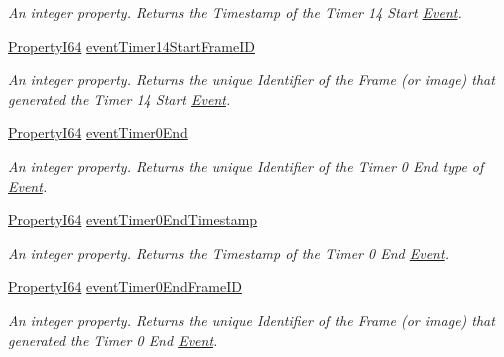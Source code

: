 \begin{DoxyCompactItemize}
\begin{DoxyCompactList}\small\item\em An integer property. Returns the Timestamp of the Timer 14 Start \hyperlink{classmv_i_m_p_a_c_t_1_1acquire_1_1_event}{Event}. \end{DoxyCompactList}\item 
\hyperlink{group___common_interface_ga81749b2696755513663492664a18a893}{Property\+I64} \hyperlink{classmv_i_m_p_a_c_t_1_1acquire_1_1_gen_i_cam_1_1_event_control_ac326d3d31139e94d4b2260f84fb7757a}{event\+Timer14\+Start\+Frame\+I\+D}
\begin{DoxyCompactList}\small\item\em An integer property. Returns the unique Identifier of the Frame (or image) that generated the Timer 14 Start \hyperlink{classmv_i_m_p_a_c_t_1_1acquire_1_1_event}{Event}. \end{DoxyCompactList}\item 
\hyperlink{group___common_interface_ga81749b2696755513663492664a18a893}{Property\+I64} \hyperlink{classmv_i_m_p_a_c_t_1_1acquire_1_1_gen_i_cam_1_1_event_control_aa40c08e47812676fa8773d0da9403446}{event\+Timer0\+End}
\begin{DoxyCompactList}\small\item\em An integer property. Returns the unique Identifier of the Timer 0 End type of \hyperlink{classmv_i_m_p_a_c_t_1_1acquire_1_1_event}{Event}. \end{DoxyCompactList}\item 
\hyperlink{group___common_interface_ga81749b2696755513663492664a18a893}{Property\+I64} \hyperlink{classmv_i_m_p_a_c_t_1_1acquire_1_1_gen_i_cam_1_1_event_control_a6411179f8c9814d88d754f88576814d6}{event\+Timer0\+End\+Timestamp}
\begin{DoxyCompactList}\small\item\em An integer property. Returns the Timestamp of the Timer 0 End \hyperlink{classmv_i_m_p_a_c_t_1_1acquire_1_1_event}{Event}. \end{DoxyCompactList}\item 
\hyperlink{group___common_interface_ga81749b2696755513663492664a18a893}{Property\+I64} \hyperlink{classmv_i_m_p_a_c_t_1_1acquire_1_1_gen_i_cam_1_1_event_control_a2b22c14c5670f55bc710e17c63554684}{event\+Timer0\+End\+Frame\+I\+D}
\begin{DoxyCompactList}\small\item\em An integer property. Returns the unique Identifier of the Frame (or image) that generated the Timer 0 End \hyperlink{classmv_i_m_p_a_c_t_1_1acquire_1_1_event}{Event}. \end{DoxyCompactList}\item 

\end{DoxyCompactItemize}
